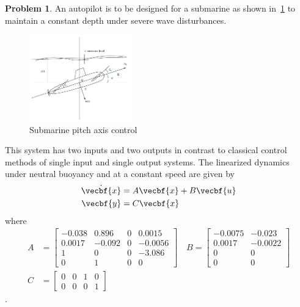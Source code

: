 \documentclass[10pt]{article}
\theoremstyle{definition}
\newtheorem{prob}{Problem}[section]
\begin{document}
\clearpage\newpage
\begin{prob}
    An autopilot is to be designed for a submarine as shown in~\cref{fig:submarine} to maintain a constant depth under severe wave disturbances.
    \begin{figure}[h]
        \centering
        \includegraphics[width=0.4\textwidth]{figures/submarine.png}
        \caption{Submarine pitch axis control~\label{fig:submarine}}
    \end{figure}
    This system has two inputs and two outputs in contrast to classical control methods of single input and single output systems.
    The linearized dynamics under neutral buoyancy and at a constant speed are given by
    \begin{align*}
        \dot{\vecbf{x}} &= A \vecbf{x} + B \vecbf{u} \\
        \vecbf{y} &= C \vecbf{x}
    \end{align*}
    where
    \begin{align*}
        A &= \begin{bmatrix}
            -0.038 & 0.896 & 0 & 0.0015 \\
            0.0017 & -0.092 & 0 & -0.0056 \\
            1 & 0 & 0 & -3.086 \\
            0 & 1 & 0 & 0
        \end{bmatrix}
        \quad 
        B = \begin{bmatrix}
            -0.0075 & -0.023 \\
            0.0017 & -0.0022 \\
            0 & 0 \\
            0 & 0
        \end{bmatrix} \\
        C &= \begin{bmatrix}
            0 & 0 & 1 & 0 \\
            0 & 0 & 0 & 1
        \end{bmatrix}
    \end{align*}. 


\end{prob}
\end{document}
